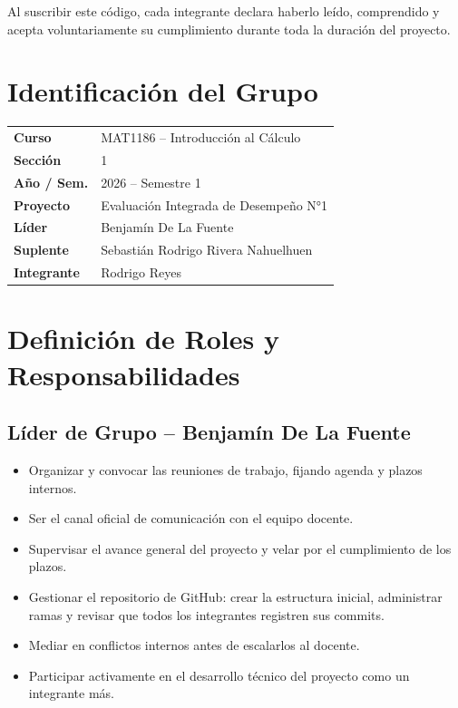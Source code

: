 \documentclass[12pt,a4paper]{article}
\begin{document}
Al suscribir este código, cada integrante declara haberlo leído, comprendido y acepta
voluntariamente su cumplimiento durante toda la duración del proyecto.

\newpage

\section{Identificación del Grupo}

\begin{center}
\renewcommand{\arraystretch}{1.6}
\begin{tabular}{>{\bfseries}p{4cm} p{8cm}}
  \toprule
  Curso      & MAT1186 -- Introducción al Cálculo \\
  Sección    & 1 \\
  Año / Sem. & 2026 -- Semestre 1 \\
  Proyecto   & Evaluación Integrada de Desempeño N°1 \\
  \midrule
  Líder      & Benjamín De La Fuente \\
  Suplente   & Sebastián Rodrigo Rivera Nahuelhuen \\
  Integrante & Rodrigo Reyes \\
  \bottomrule
\end{tabular}
\end{center}

\section{Definición de Roles y Responsabilidades}

\subsection{Líder de Grupo -- Benjamín De La Fuente}

\begin{itemize}[leftmargin=1.5em, itemsep=3pt]
  \item Organizar y convocar las reuniones de trabajo, fijando agenda y plazos internos.
  \item Ser el canal oficial de comunicación con el equipo docente.
  \item Supervisar el avance general del proyecto y velar por el cumplimiento de los plazos.
  \item Gestionar el repositorio de GitHub: crear la estructura inicial, administrar ramas y revisar que todos los integrantes registren sus commits.
  \item Mediar en conflictos internos antes de escalarlos al docente.
  \item Participar activamente en el desarrollo técnico del proyecto como un integrante más.
\end{itemize}
\end{document}
